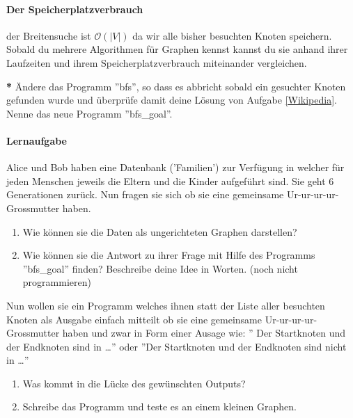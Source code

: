 \paragraph{Der Speicherplatzverbrauch} der Breitensuche ist $\mathcal{O}(|V|)$ da wir alle bisher besuchten Knoten speichern. Sobald du mehrere Algorithmen für Graphen kennst kannst du sie anhand ihrer Laufzeiten und ihrem Speicherplatzverbrauch miteinander vergleichen.

\begin{aufgabe}  \label{WikiProgAufg} {\bf{*}}
Ändere das Programm ''bfs'', so dass es abbricht sobald ein gesuchter Knoten gefunden wurde und überprüfe damit deine Lösung von Aufgabe \ref{Wikipedia}. Nenne das neue Programm ''bfs\_goal''.
\end{aufgabe}

\paragraph{Lernaufgabe}
Alice und Bob haben eine Datenbank ('Familien') zur Verfügung in welcher für jeden Menschen jeweils die Eltern und die Kinder aufgeführt sind. Sie geht 6 Generationen zurück. Nun fragen sie sich ob sie eine gemeinsame Ur-ur-ur-ur-Grossmutter haben. 
\begin{enumerate}
    \item Wie können sie die Daten als ungerichteten Graphen darstellen?
    \item Wie können sie die Antwort zu ihrer Frage mit Hilfe des Programms ''bfs\_goal'' finden? Beschreibe deine Idee in Worten. (noch nicht programmieren)
\end{enumerate}
Nun wollen sie ein Programm welches ihnen statt der Liste aller besuchten Knoten als Ausgabe einfach mitteilt ob sie eine gemeinsame Ur-ur-ur-ur-Grossmutter haben und zwar in Form einer Ausage wie: '' Der Startknoten und der Endknoten sind in \dots '' oder ''Der Startknoten und der Endknoten sind nicht in \dots''
\begin{enumerate}[resume]
    \item Was kommt in die Lücke des gewünschten Outputs?
    \item Schreibe das Programm und teste es an einem kleinen Graphen.
\end{enumerate}


